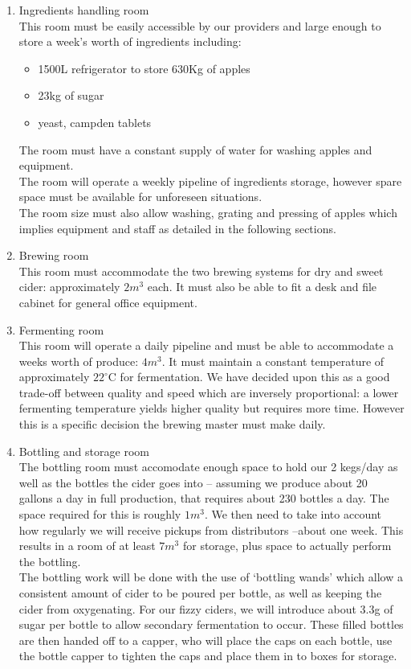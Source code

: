 \documentclass[11pt]{article}
\begin{document}
  \begin{enumerate}
  \item Ingredients handling room \\
  This room must be easily accessible by our providers and large enough to store a week's worth of ingredients including:
    \begin{itemize}
    \item 1500L refrigerator to store 630Kg of apples
    \item 23kg of sugar
    \item yeast, campden tablets
    \end{itemize}
  The room must have a constant supply of water for washing apples and equipment. \\
  The room will operate a weekly pipeline of ingredients storage, however spare space must be available for unforeseen situations.\\
  The room size must also allow washing, grating and pressing of apples which implies equipment and staff as detailed in the following sections.

  \item Brewing room \\
  This room must accommodate the two brewing systems for dry and sweet cider: approximately $2m^3$ each. It must also be able to fit a desk and file cabinet for general office equipment.
  \item Fermenting room \\
  This room will operate a daily pipeline and must be able to accommodate a weeks worth of produce: $4m^3$. It must maintain a constant temperature of approximately $22^\circ$C for fermentation. We have decided upon this as a good trade-off between quality and speed which are inversely proportional: a lower fermenting temperature yields higher quality but requires more time. However this is a specific decision the brewing master must make daily.

  \item Bottling and storage room \\
  The bottling room must accomodate enough space to hold our 2 kegs/day as well as the bottles the cider goes into -- assuming we produce about 20 gallons a day in full production, that requires about 230 bottles a day. The space required for this is roughly $1m^3$. We then need to take into account how regularly we will receive pickups from distributors --about one week. This results in a room of at least $7m^3$ for storage, plus space to actually perform the bottling. \\
The bottling work will be done with the use of `bottling wands' which allow a consistent amount of cider to be poured per bottle, as well as keeping the cider from oxygenating. For our fizzy ciders, we will introduce about 3.3g of sugar per bottle to allow secondary fermentation to occur. These filled bottles are then handed off to a capper, who will place the caps on each bottle, use the bottle capper to tighten the caps and place them in to boxes for storage.


\end{enumerate}
\end{document}

